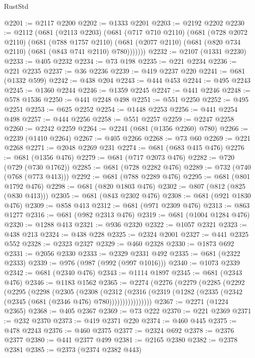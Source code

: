 \begin{lexlean}{RustStd}
\begin{coremodule}
@2201 := @2117 @2200
@2202 := @1333 @2201
@2203 := @2192 @2202
@2230 := @2112
    (@681
      (@2113 @2203)
      (@681
        (@717 @710 @2110)
        (@681
          (@728 @2072 @2110)
          (@681
            (@788 @1757 @2110)
            (@681 (@2077 @2110) (@681 (@820 @734 @2110) (@681 (@843 @741 @2110) @780)))))))
@2232 := @2107 (@1331 @2230)
@2233 := @405 @2232
@2234 := @73 @198
@2235 := @221 @2234
@2236 := @221 @2235
@2237 := @36 @2236
@2239 := @419 @2237 @220
@2241 := @681 (@1332 @599)
@2242 := @438 @204
@2243 := @444 @453
@2244 := @495 @2243
@2245 := @1360 @2244
@2246 := @1359 @2245
@2247 := @441 @2246
@2248 := @578 @1536
@2250 := @441 @2248 @498
@2251 := @551 @2250
@2252 := @495 @2251
@2253 := @625 @2252
@2254 := @1448 @2253
@2256 := @441 @2254 @498
@2257 := @444 @2256
@2258 := @551 @2257
@2259 := @2247 @2258
@2260 := @2242 @2259
@2264 := @2241 (@681 (@1356 @2260) @780)
@2266 := @2239 (@1410 @2264)
@2267 := @405 @2266
@2268 := @73 @60
@2269 := @221 @2268
@2271 := @2048 @2269 @231
@2274 := @681 (@683 @415 @476)
@2276 := @681 (@1356 @476)
@2279 := @681 (@717 @2073 @476)
@2282 := @720 (@729 (@730 @1762))
@2285 := @681 (@728 @2282 @476)
@2289 := @732 (@740 (@768 (@773 @413)))
@2292 := @681 (@788 @2289 @476)
@2295 := @681 (@801 @1792 @476)
@2298 := @681 (@820 @1803 @476)
@2302 := @807 (@812 (@825 (@830 @413)))
@2305 := @681 (@843 @2302 @476)
@2308 := @681 (@921 @1830 @476)
@2309 := @858 @413
@2312 := @681 (@971 @2309 @476)
@2313 := @863 @1277
@2316 := @681 (@982 @2313 @476)
@2319 := @681 (@1004 @1284 @476)
@2320 := @1288 @413
@2321 := @936 @2320
@2322 := @1057 @2321
@2323 := @438 @213
@2324 := @438 @228
@2325 := @2324 @2001
@2327 := @441 @2325 @552
@2328 := @2323 @2327
@2329 := @460 @2328
@2330 := @1873 @692
@2331 := @2056 @2330
@2333 := @2329 @2331 @492
@2335 := @681 (@2322 @2333)
@2339 := @976 (@987 (@992 (@997 @1016)))
@2340 := @1073 @2339
@2342 := @681 (@2340 @476)
@2343 := @1114 @1897
@2345 := @681 (@2343 @476)
@2346 := @1183 @1562
@2365 := @2274
    (@2276
      (@2279
        (@2285
          (@2292
            (@2295
              (@2298
                (@2305
                  (@2308
                    (@2312
                      (@2316
                        (@2319 (@1282 (@2335 (@2342 (@2345 (@681 (@2346 @476) @780))))))))))))))))
@2367 := @2271 (@1224 @2365)
@2368 := @405 @2367
@2369 := @73 @222
@2370 := @221 @2369
@2371 := @232 @2370
@2373 := @419 @2371 @220
@2374 := @460 @445
@2375 := @478 @2243
@2376 := @460 @2375
@2377 := @2324 @692
@2378 := @2376 @2377
@2380 := @441 @2377 @499
@2381 := @2165 @2380
@2382 := @2378 @2381
@2385 := @2373 (@2374 @2382 @443)

\end{coremodule}
\end{lexlean}
